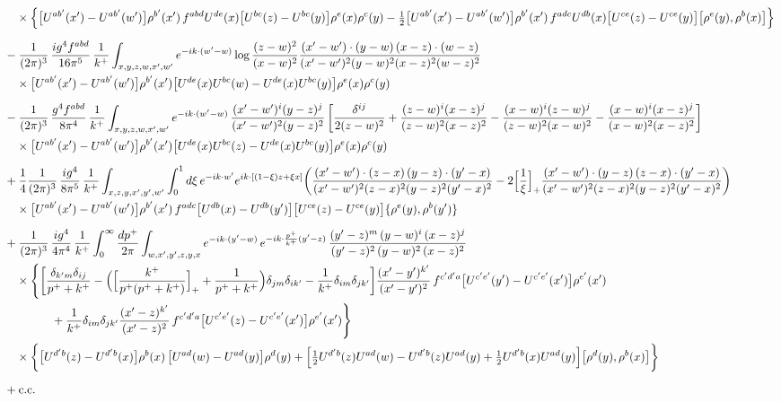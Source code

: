 \documentclass[10pt]{article}
\begin{document}
\begin{align}
&\quad\times\Big\{\big[U^{ab'}(x')-U^{ab'}(w')\big]\rho^{b'}(x')\,f^{abd}U^{de}(x)\big[U^{bc}(z)-U^{bc}(y)\big]\rho^{e}(x)\rho^{c}(y)-\tfrac12\big[U^{ab'}(x')-U^{ab'}(w')\big]\rho^{b'}(x')\,f^{adc}U^{db}(x)\big[U^{ce}(z)-U^{ce}(y)\big]\big[\rho^{e}(y),\rho^{b}(x)\big]\Big\}\notag\\[6pt]
&-\frac{1}{(2\pi)^{3}}\,\frac{ig^{4}f^{abd}}{16\pi^{5}}\,\frac{1}{k^{+}}\int_{x,y,z,w,x',w'}e^{-ik\cdot(w'-w)}\log\frac{(z-w)^{2}}{(x-w)^{2}}\frac{(x'-w')\cdot(y-w)\,(x-z)\cdot(w-z)}{(x'-w')^{2}(y-w)^{2}(x-z)^{2}(w-z)^{2}}\notag\\
&\quad\times\big[U^{ab'}(x')-U^{ab'}(w')\big]\rho^{b'}(x')\big[U^{de}(x)U^{bc}(w)-U^{de}(x)U^{bc}(y)\big]\rho^{e}(x)\rho^{c}(y)\notag\\[6pt]
&-\frac{1}{(2\pi)^{3}}\,\frac{g^{4}f^{abd}}{8\pi^{4}}\,\frac{1}{k^{+}}\int_{x,y,z,w,x',w'}e^{-ik\cdot(w'-w)}\,\frac{(x'-w')^{i}(y-z)^{j}}{(x'-w')^{2}(y-z)^{2}}\,\bigg[\frac{\delta^{ij}}{2(z-w)^{2}}+\frac{(z-w)^{i}(x-z)^{j}}{(z-w)^{2}(x-z)^{2}}-\frac{(x-w)^{i}(z-w)^{j}}{(z-w)^{2}(x-w)^{2}}-\frac{(x-w)^{i}(x-z)^{j}}{(x-w)^{2}(x-z)^{2}}\bigg]\notag\\
&\quad\times\big[U^{ab'}(x')-U^{ab'}(w')\big]\rho^{b'}(x')\big[U^{de}(x)U^{bc}(z)-U^{de}(x)U^{bc}(y)\big]\rho^{e}(x)\rho^{c}(y)\notag\\[6pt]
&+\frac14\frac{1}{(2\pi)^{3}}\,\frac{ig^{4}}{8\pi^{5}}\,\frac{1}{k^{+}}\int_{x,z,y,x',y',w'}\int_{0}^{1}d\xi\,e^{-ik\cdot w'}e^{ik\cdot[(1-\xi)z+\xi x]}\bigg(\frac{(x'-w')\cdot(z-x)\,(y-z)\cdot(y'-x)}{(x'-w')^{2}(z-x)^{2}(y-z)^{2}(y'-x)^{2}}-2\Big[\frac1\xi\Big]_{+}\frac{(x'-w')\cdot(y-z)\,(z-x)\cdot(y'-x)}{(x'-w')^{2}(z-x)^{2}(y-z)^{2}(y'-x)^{2}}\bigg)\notag\\
&\quad\times\big[U^{ab'}(x')-U^{ab'}(w')\big]\rho^{b'}(x')\,f^{adc}\big[U^{db}(x)-U^{db}(y')\big]\big[U^{ce}(z)-U^{ce}(y)\big]\{\rho^{e}(y),\rho^{b}(y')\}\notag\\[6pt]
&+\frac{1}{(2\pi)^{3}}\,\frac{ig^{4}}{4\pi^{4}}\,\frac{1}{k^{+}}\int_{0}^{\infty}\frac{dp^{+}}{2\pi}\int_{w,x',y',z,y,x}e^{-ik\cdot(y'-w)}\,e^{-ik\cdot\frac{p^{+}}{k^{+}}(y'-z)}\,\frac{(y'-z)^{m}\,(y-w)^{i}\,(x-z)^{j}}{(y'-z)^{2}\,(y-w)^{2}\,(x-z)^{2}}\notag\\
&\quad\times\Bigg\{\bigg[\frac{\delta_{k'm}\delta_{ij}}{p^{+}+k^{+}}-\Big(\Big[\frac{k^{+}}{p^{+}(p^{+}+k^{+})}\Big]_{+}+\frac{1}{p^{+}+k^{+}}\Big)\delta_{jm}\delta_{ik'}-\frac{1}{k^{+}}\delta_{im}\delta_{jk'}\bigg]\frac{(x'-y')^{k'}}{(x'-y')^{2}}\,f^{c'd'a}\big[U^{c'e'}(y')-U^{c'e'}(x')\big]\rho^{e'}(x')\notag\\
&\qquad\qquad+\frac{1}{k^{+}}\delta_{im}\delta_{jk'}\frac{(x'-z)^{k'}}{(x'-z)^{2}}\,f^{c'd'a}\big[U^{c'e'}(z)-U^{c'e'}(x')\big]\rho^{e'}(x')\Bigg\}\notag\\
&\quad\times\bigg\{\big[U^{d'b}(z)-U^{d'b}(x)\big]\rho^{b}(x)\,\big[U^{ad}(w)-U^{ad}(y)\big]\rho^{d}(y)+\Big[\tfrac12U^{d'b}(z)U^{ad}(w)-U^{d'b}(z)U^{ad}(y)+\tfrac12U^{d'b}(x)U^{ad}(y)\Big]\big[\rho^{d}(y),\rho^{b}(x)\big]\bigg\}\notag\\[6pt]
&+{\rm c.c.}
\end{align}
\end{document}
